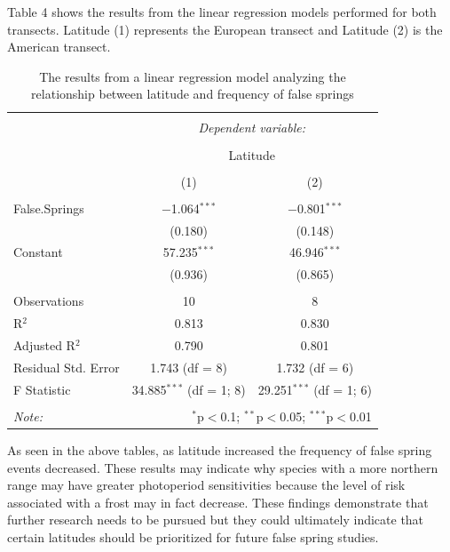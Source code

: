 \documentclass{article}\usepackage[]{graphicx}\usepackage[]{color}
\begin{document}
Table 4 shows the results from the linear regression models performed for both transects. Latitude (1) represents the European transect and Latitude (2) is the American transect. 


\begin{table}[!htbp] \centering 
  \caption{The results from a linear regression model analyzing the relationship between latitude and frequency of false springs} 
  \label{} 
\begin{tabular}{@{\extracolsep{5pt}}lcc} 
\\[-1.8ex]\hline 
\hline \\[-1.8ex] 
 & \multicolumn{2}{c}{\textit{Dependent variable:}} \\ 
\cline{2-3} 
\\[-1.8ex] & \multicolumn{2}{c}{Latitude} \\ 
\\[-1.8ex] & (1) & (2)\\ 
\hline \\[-1.8ex] 
 False.Springs & $-$1.064$^{***}$ & $-$0.801$^{***}$ \\ 
  & (0.180) & (0.148) \\ 
  Constant & 57.235$^{***}$ & 46.946$^{***}$ \\ 
  & (0.936) & (0.865) \\ 
 \hline \\[-1.8ex] 
Observations & 10 & 8 \\ 
R$^{2}$ & 0.813 & 0.830 \\ 
Adjusted R$^{2}$ & 0.790 & 0.801 \\ 
Residual Std. Error & 1.743 (df = 8) & 1.732 (df = 6) \\ 
F Statistic & 34.885$^{***}$ (df = 1; 8) & 29.251$^{***}$ (df = 1; 6) \\ 
\hline 
\hline \\[-1.8ex] 
\textit{Note:}  & \multicolumn{2}{r}{$^{*}$p$<$0.1; $^{**}$p$<$0.05; $^{***}$p$<$0.01} \\ 
\end{tabular} 
\end{table} 


As seen in the above tables, as latitude increased the frequency of false spring events decreased. These results may indicate why species with a more northern range may have greater photoperiod sensitivities \citep{Caffarra2011} because the level of risk associated with a frost may in fact decrease. These findings demonstrate that further research needs to be pursued but they could ultimately indicate that certain latitudes should be prioritized for future false spring studies. 
\end{document}
